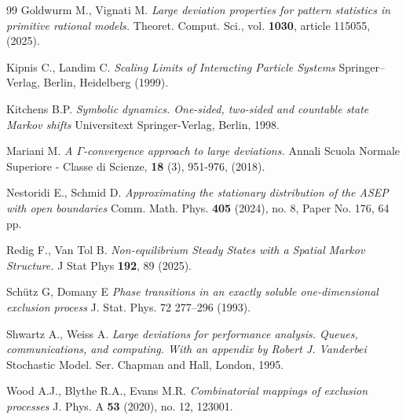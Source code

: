\documentclass[reqno]{amsart}
\theoremstyle{plain}
\theoremstyle{definition}
\theoremstyle{remark}
\numberwithin{equation}{section}
\numberwithin{theorem}{section}
\newcommand{\<}{\langle}
\renewcommand{\>}{\rangle}
\begin{document}
\begin{thebibliography}{99}
		 Goldwurm M., Vignati M. {\it Large deviation properties for pattern
			statistics in primitive rational models.} Theoret. Comput. Sci., vol. {\bf 1030},
		article 115055, (2025).
		
		 Kipnis C., Landim C. {\it Scaling Limits of Interacting Particle Systems} Springer–Verlag, Berlin, Heidelberg (1999).
		
		 Kitchens B.P.
		{\it Symbolic dynamics.
			One-sided, two-sided and countable state Markov shifts}
		Universitext
		Springer-Verlag, Berlin, 1998.
		
		 Mariani M. {\it A $\Gamma$-convergence approach to large deviations.} Annali Scuola Normale Superiore - Classe di Scienze, {\bf 18} (3), 951-976, (2018).
		
		 Nestoridi E., Schmid D.
		{\it Approximating the stationary distribution of the ASEP with open boundaries}
		Comm. Math. Phys. {\bf 405} (2024), no. 8, Paper No. 176, 64 pp.
		
		 Redig F., Van Tol B. {\it Non-equilibrium Steady States with a Spatial Markov Structure.} J Stat Phys {\bf 192}, 89 (2025).
		
		 Schütz G, Domany E {\it Phase transitions in an exactly soluble one-dimensional exclusion process} J. Stat. Phys. 72 277–296 (1993).
		
		
		 Shwartz A., Weiss A.
		{\it Large deviations for performance analysis.
			Queues, communications, and computing. With an appendix by Robert J. Vanderbei}
		Stochastic Model. Ser.
		Chapman and Hall, London, 1995.
		
		  Wood A.J., Blythe R.A., Evans M.R. {\it Combinatorial mappings of exclusion processes}
		J. Phys. A {\bf 53} (2020), no. 12, 123001.
		
		
	\end{thebibliography}
	
\end{document}
